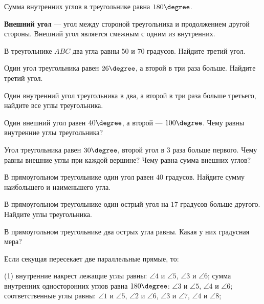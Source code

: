 %

\begin{class}[number=1]
	\begin{definit}
		Сумма внутренних углов в треугольнике равна \( 180\degree \).
	\end{definit}
	\begin{definit}
		\textbf{Внешний угол} --- угол между стороной треугольника и продолжением другой стороны. Внешний угол является смежным с одним из внутренних.
	\end{definit}
	\begin{listofex}
		\item В треугольнике \( ABC \) два угла равны \( 50\) и \( 70 \) градусов. Найдите третий угол.
		\item Один угол треугольника равен \( 26\degree \), а второй в три раза больше. Найдите третий угол.
		\item Один внутренний угол треугольника в два, а второй в три раза больше третьего, найдите все углы треугольника.
		\item Один внешний угол равен \( 40\degree \), а второй --- \( 100\degree \). Чему равны внутренние углы треугольника?
		\item Угол треугольника равен \( 30\degree \), второй угол в \( 3 \) раза больше первого. Чему равны внешние углы при каждой вершине? Чему равна сумма внешних углов?
		\item В прямоугольном треугольнике один угол равен \( 40 \) градусов. Найдите сумму наибольшего и наименьшего угла.
		\item В прямоугольном треугольнике один острый угол на \( 17 \) градусов больше другого. Найдите углы треугольника.
		\item В прямоугольном треугольнике два острых угла равны. Какая у них градусная мера?
	\end{listofex}
	\begin{definit}
		Если секущая пересекает две параллельные прямые, то:
		\begin{tasks}(1)
			\task внутренние накрест лежащие углы равны: \( \angle 4 \) и \( \angle5 \), \( \angle 3 \) и \( \angle 6\);
			\task сумма внутренних односторонних углов равна  \(180\degree\): \( \angle 3 \) и \( \angle 5 \), \( \angle 4 \) и \( \angle 6 \);
			\task соответственные углы равны: \( \angle 1 \) и \( \angle 5 \), \( \angle 2 \) и \( \angle 6 \), \( \angle 3 \) и \( \angle 7 \), \( \angle 4 \) и \( \angle 8 \);

\end{tasks}
\end{definit}
\end{class}
